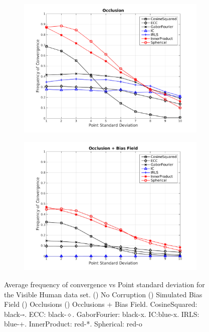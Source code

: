 \begin{figure}
\begin{subfigure}{0.52\textwidth}
        \caption{}\label{fig:lk_results_biasfield}
    \end{subfigure} \\
    \begin{subfigure}{0.52\textwidth}
        \includegraphics[width=\textwidth]{statistical_normals/lk/3d/images/Occlusion_Smoothing_2-crop}
        \caption{}\label{fig:lk_results_occlusion}
    \end{subfigure} \hspace*{-1cm}
    \begin{subfigure}{0.52\textwidth}
        \includegraphics[width=\textwidth]{statistical_normals/lk/3d/images/Occlusion_BiasField_Smoothing_2-crop}
        \caption{}\label{fig:lk_results_occlusion_biasfield}
    \end{subfigure}
    \caption{Average frequency of convergence vs Point standard deviation for
             the Visible Human data set.
             () No Corruption
             () Simulated Bias Field
             () Occlusions
             () Occlusions + Bias Field.
             CosineSquared: black-$\square$. ECC:\@
             black-$\diamond$. GaborFourier: black-x. IC:\@ blue-x. IRLS:\@
             blue-+. InnerProduct: red-*. Spherical: red-o}
\label{fig:lk_results_corrupted}
\end{figure}
